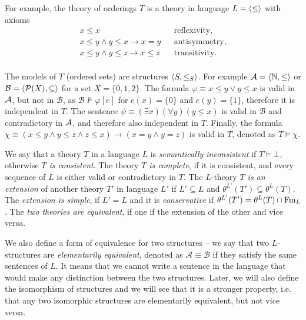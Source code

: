 
For example, the theory of orderings $T$ is a theory in language $L=\langle \leq \rangle$ with axioms
\begin{align*}
	x \leq x & & \text{reflexivity,} \\
	x \leq y \land y \leq x \to x = y & & \text{antisymmetry,} \\
	x \leq y \land y \leq z \to x \leq z & & \text{transitivity.} \\
\end{align*}

The models of $T$ (ordered sets) are structures $\langle S, \leq_S \rangle$. For example $\mathcal{A} = \langle \mathbb{N}, \leq \rangle$ or $\mathcal{B} = \langle \mathcal{P}(X), \subseteq \rangle$ for a set $X = \{0,1,2\}$. The formula $\varphi \equiv x \leq y \lor y \leq x$ is valid in $\mathcal{A}$, but not in $\mathcal{B}$, as $\mathcal{B} \nvDash \varphi[e]$ for $e(x) = \{0\}$ and $e(y)=\{1\}$, therefore it is independent in $T$. The sentence $\psi \equiv (\exists x)(\forall y)(y \leq x)$ is valid in $\mathcal{B}$ and contradictory in $\mathcal{A}$, and therefore also independent in $T$. Finally, the formula $\chi \equiv (x \leq y \land y \leq z \land z \leq x) \to (x = y \land y = z)$ is valid in $T$, denoted as $T \vDash \chi$.

We say that a theory $T$ in a language $L$ is \emph{semantically inconsistent} if $T \vDash \bot$, otherwise \emph{$T$ is consistent}. The theory \emph{$T$ is complete}, if it is consistent, and every sequence of $L$ is either valid or contradictory in $T$. The $L$-theory \emph{$T$ is an extension} of another theory $T'$ in language $L'$ if $L' \subseteq L$ and $\theta^{L'}(T') \subseteq \theta^L(T)$. The \emph{extension is simple}, if $L' = L$ and it is \emph{conservative} if $\theta^{L'}(T') = \theta^L(T) \cap \operatorname{Fm}_L$. The \emph{two theories are equivalent}, if one if the extension of the other and vice versa.

We also define a form of equivalence for two structures -- we say that two $L$-structures are \emph{elementarily equivalent}, denoted as $\mathcal{A} \equiv \mathcal{B}$ if they satisfy the same sentences of $L$. It means that we cannot write a sentence in the language that would make any distinction between the two structures. Later, we will also define the isomorphism of structures and we will see that it is a stronger property, i.e. that any two isomorphic structures are elementarily equivalent, but not vice versa.

